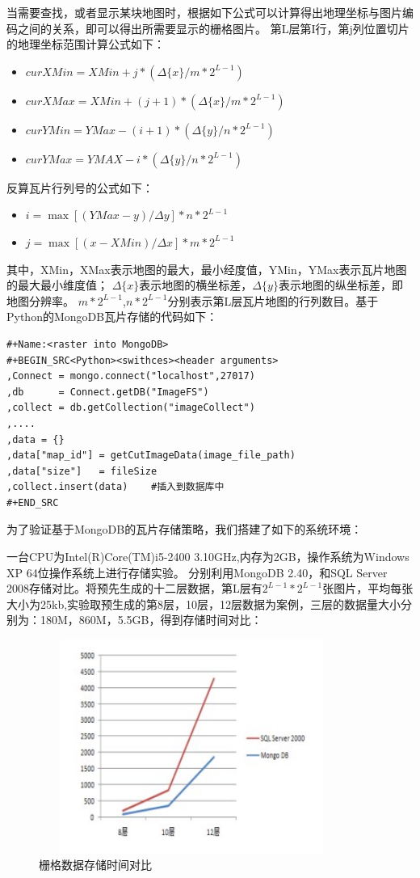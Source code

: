 \documentclass[master]{njnuthesis}
\begin{document}
当需要查找，或者显示某块地图时，根据如下公式可以计算得出地理坐标与图片编码之间的关系，即可以得出所需要显示的栅格图片。
第L层第I行，第j列位置切片的地理坐标范围计算公式如下：
\begin{itemize}
\item $ curXMin = XMin + j*(\Delta\{x\}/m*2^{L-1})$
\item $ curXMax = XMin + (j+1)*(\Delta\{x\}/m*2^{L-1})$
\item $ curYMin = YMax - (i+1)*(\Delta\{y\}/n*2^{L-1})$
\item $ curYMax = YMAX - i*(\Delta\{y\}/n*2^{L-1})$
\end{itemize}
反算瓦片行列号的公式如下：
\begin{itemize}
\item $i = \max{[(YMax -y)/\Delta{y}]*n*2^{L-1}}$
\item $j = \max{[(x-XMin)/\Delta{x}]*m*2^{L-1}}$
\end{itemize}
其中，XMin，XMax表示地图的最大，最小经度值，YMin，YMax表示瓦片地图的最大最小维度值；
$\Delta\{x\}$表示地图的横坐标差，$\Delta\{y\}$表示地图的纵坐标差，即地图分辨率。
$m*2^{L-1}$,$n*2^{L-1}$分别表示第L层瓦片地图的行列数目。基于Python的MongoDB瓦片存储的代码如下：
\begin{verbatim}
#+Name:<raster into MongoDB>
#+BEGIN_SRC<Python><swithces><header arguments>
,Connect = mongo.connect("localhost",27017)
,db      = Connect.getDB("ImageFS")
,collect = db.getCollection("imageCollect")
,....
,data = {}
,data["map_id"] = getCutImageData(image_file_path)
,data["size"]   = fileSize
,collect.insert(data)    #插入到数据库中
#+END_SRC
\end{verbatim}

为了验证基于MongoDB的瓦片存储策略，我们搭建了如下的系统环境：

一台CPU为Intel(R)Core(TM)i5-2400 3.10GHz,内存为2GB，操作系统为Windows XP 64位操作系统上进行存储实验。
分别利用MongoDB 2.40，和SQL Server 2008存储对比。将预先生成的十二层数据，第L层有$2^{L-1}*2^{L-1}$张图片，平均每张大小为25kb,实验取预生成的第8层，10层，12层数据为案例，三层的数据量大小分别为：180M，860M，5.5GB，得到存储时间对比：

\begin{figure}[h]
\begin{center}
\includegraphics[angle=0,width=10cm,height=7cm]{pic//raster_insert.jpg}
\caption{栅格数据存储时间对比}
\label{fig:3}
\end{center}
\end{figure}
\end{document}
